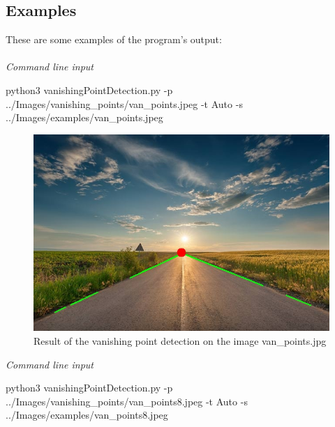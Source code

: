 \begin{multicols}{2}
\subsection{Examples}

These are some examples of the program's output:\\
\\
\textit{Command line input}

\begin{bashscript}
    python3 vanishingPointDetection.py -p ../Images/vanishing_points/van_points.jpeg -t Auto -s ../Images/examples/van_points.jpeg
\end{bashscript}

\begin{figure}[H]
    \centering
    \includegraphics[width=0.98\columnwidth]{../Images/examples/van_points.jpg}
    \caption{Result of the vanishing point detection on the image van\_points.jpg}
    \label{fig-6}
\end{figure}

\noindent
\textit{Command line input}

\begin{bashscript}
    python3 vanishingPointDetection.py -p ../Images/vanishing_points/van_points8.jpeg -t Auto -s ../Images/examples/van_points8.jpeg
\end{bashscript}


\end{multicols}
